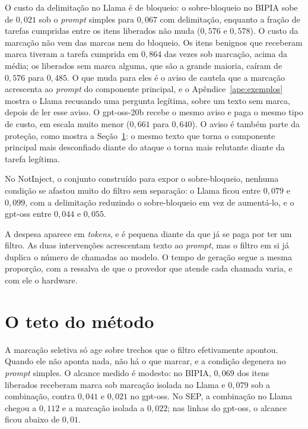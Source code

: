 O custo da delimitação no Llama é de bloqueio: o sobre-bloqueio no BIPIA sobe
de $0{,}021$ sob o \textit{prompt} simples para $0{,}067$ com delimitação,
enquanto a fração de tarefas cumpridas entre os itens liberados não muda
($0{,}576$ e $0{,}578$). O custo da marcação não vem das marcas nem do
bloqueio. Os itens benignos que receberam marca tiveram a tarefa cumprida em
$0{,}864$ das vezes sob marcação, acima da média; os liberados sem marca
alguma, que são a grande maioria, caíram de $0{,}576$ para $0{,}485$. O que
muda para eles é o aviso de cautela que a marcação acrescenta ao
\textit{prompt} do componente principal, e o Apêndice~\ref{ape:exemplos}
mostra o Llama recusando uma pergunta legítima, sobre um texto sem marca,
depois de ler esse aviso. O gpt-oss-20b recebe o mesmo aviso e paga o mesmo
tipo de custo, em escala muito menor ($0{,}661$ para $0{,}640$). O aviso é
também parte da proteção, como mostra a Seção~\ref{sec:conc_teto}: o mesmo
texto que torna o componente principal mais desconfiado diante do ataque o
torna mais relutante diante da tarefa legítima.

No NotInject, o conjunto construído para expor o sobre-bloqueio, nenhuma
condição se afastou muito do filtro sem separação: o Llama ficou entre
$0{,}079$ e $0{,}099$, com a delimitação reduzindo o sobre-bloqueio em vez de
aumentá-lo, e o gpt-oss entre $0{,}044$ e $0{,}055$.

A despesa aparece em \textit{tokens}, e é pequena diante da que já se paga por
ter um filtro. As duas intervenções acrescentam texto ao \textit{prompt}, mas o
filtro em si já duplica o número de chamadas ao modelo. O tempo de geração
segue a mesma proporção, com a ressalva de que o provedor que atende cada
chamada varia, e com ele o hardware.

\section{O teto do método}\label{sec:conc_teto}

A marcação seletiva só age sobre trechos que o filtro efetivamente apontou.
Quando ele não aponta nada, não há o que marcar, e a condição degenera no
\textit{prompt} simples. O alcance medido é modesto: no BIPIA, $0{,}069$ dos
itens liberados receberam marca sob marcação isolada no Llama e $0{,}079$ sob
a combinação, contra $0{,}041$ e $0{,}021$ no gpt-oss. No SEP, a combinação no
Llama chegou a $0{,}112$ e a marcação isolada a $0{,}022$; nas linhas do
gpt-oss, o alcance ficou abaixo de $0{,}01$.


